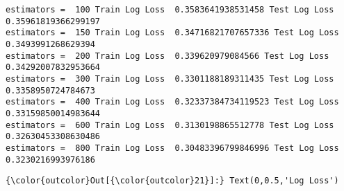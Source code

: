 \documentclass[11pt]{article}
\begin{document}
    \begin{Verbatim}[commandchars=\\\{\}]
estimators =  100 Train Log Loss  0.3583641938531458 Test Log Loss  0.35961819366299197
estimators =  150 Train Log Loss  0.34716821707657336 Test Log Loss  0.3493991268629394
estimators =  200 Train Log Loss  0.339620979084566 Test Log Loss  0.34292007832953664
estimators =  300 Train Log Loss  0.3301188189311435 Test Log Loss  0.3358950724784673
estimators =  400 Train Log Loss  0.32337384734119523 Test Log Loss  0.33159850014983644
estimators =  600 Train Log Loss  0.3130198865512778 Test Log Loss  0.32630453308630486
estimators =  800 Train Log Loss  0.30483396799846996 Test Log Loss  0.3230216993976186

    \end{Verbatim}

\begin{Verbatim}[commandchars=\\\{\}]
{\color{outcolor}Out[{\color{outcolor}21}]:} Text(0,0.5,'Log Loss')
\end{Verbatim}
            
    \begin{center}
    \end{center}
    { \hspace*{\fill} \\}
    
\end{document}
